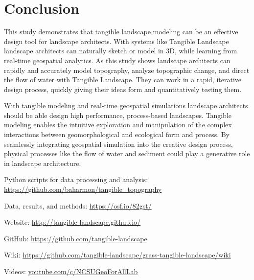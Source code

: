 \documentclass[Afour,sagev,times]{sagej} %
\begin{document}

\section{Conclusion}
%
This study demonstrates that tangible landscape modeling
can be an effective design tool for landscape architects.
%
With systems like Tangible Landscape
landscape architects can naturally sketch or model in 3D,
while learning from real-time geospatial analytics.
%
As this study shows
landscape architects can
rapidly and accurately model topography, 
analyze topographic change, 
and direct the flow of water 
with Tangible Landscape.
%
They can work in a rapid, iterative design process,
quickly giving their ideas form and quantitatively testing them.

With tangible modeling 
and real-time geospatial simulations 
landscape architects should be able design 
high performance, process-based landscapes.
%
Tangible modeling enables
the intuitive exploration and manipulation
of the complex interactions between 
geomorphological and ecological
form and process. 
%
By seamlessly integrating geospatial simulation into
the creative design process, 
physical processes like the flow of water and sediment
could play a generative role in landscape architecture. 



\begin{sm}
%
\noindent
Python scripts for data processing and analysis: \\
\noindent
\url{https://github.com/baharmon/tangible_topography}

\noindent
Data, results, and methods: \url{https://osf.io/82gst/}

\noindent
Website: \url{http://tangible-landscape.github.io/}

\noindent
GitHub: \url{https://github.com/tangible-landscape}

\noindent
Wiki: \url{https://github.com/tangible-landscape/grass-tangible-landscape/wiki}

\noindent
Videos: \url{youtube.com/c/NCSUGeoForAllLab}
\end{sm}





 
\end{document}
